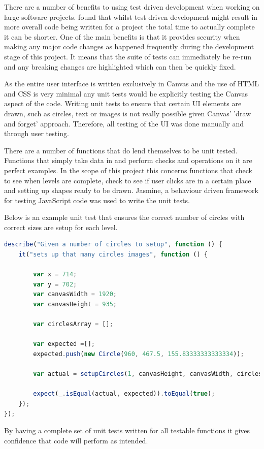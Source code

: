 \documentclass[12pt,a4paper]{report}
\begin{document}
   There are a number of benefits to using test driven development when working on large software projects. \cite{muller2003return} found that whilst test driven development might result in more overall code being written for a project the total time to actually complete it can be shorter. One of the main benefits is that it provides security when making any major code changes as happened frequently during the development stage of this project. It means that the suite of tests can immediately be re-run and any breaking changes are highlighted which can then be quickly fixed.

As the entire user interface is written exclusively in Canvas and the use of HTML and CSS is very minimal any unit tests would be explicitly testing the Canvas aspect of the code. Writing unit tests to ensure that certain UI elements are drawn, such as circles, text or images is not really possible given Canvas' 'draw and forget' approach. Therefore, all testing of the UI was done manually and through user testing.

There are a number of functions that do lend themselves to be unit tested. Functions that simply take data in and perform checks and operations on it are perfect examples. In the scope of this project this concerns functions that check to see when levels are complete, check to see if user clicks are in a certain place and setting up shapes ready to be drawn. Jasmine, a behaviour driven framework for testing JavaScript code was used to write the unit tests.

Below is an example unit test that ensures the correct number of circles with correct sizes are setup for each level. 
\begin{lstlisting}[language=JavaScript]
describe("Given a number of circles to setup", function () {
    it("sets up that many circles images", function () {

        var x = 714;
        var y = 702;
        var canvasWidth = 1920;
        var canvasHeight = 935;

        var circlesArray = [];

        var expected =[];
        expected.push(new Circle(960, 467.5, 155.83333333333334));

        var actual = setupCircles(1, canvasHeight, canvasWidth, circlesArray);

        expect(_.isEqual(actual, expected)).toEqual(true);
    });
});
\end{lstlisting}

By having a complete set of unit tests written for all testable functions it gives confidence that code will perform as intended.
\end{document}

